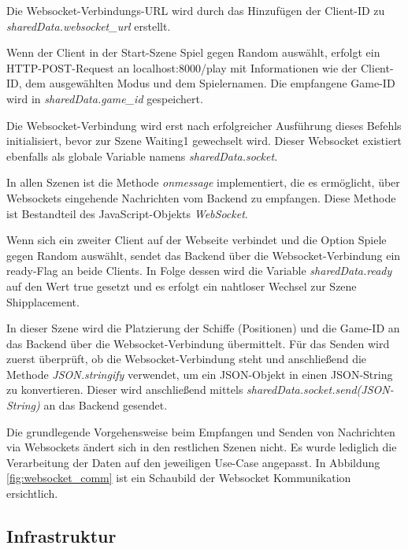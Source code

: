 \documentclass[a4paper, 10pt, conference]{IEEEtran}
\begin{document}
Die Websocket-Verbindungs-URL wird durch das Hinzufügen der Client-ID zu \textit{sharedData.websocket\_url} erstellt.

Wenn der Client in der Start-Szene \glqq Spiel gegen Random\grqq{} auswählt, erfolgt ein HTTP-POST-Request an \glqq localhost:8000/play\grqq{} mit Informationen wie der Client-ID, dem ausgewählten Modus und dem Spielernamen. Die empfangene Game-ID wird in \textit{sharedData.game\_id} gespeichert.

Die Websocket-Verbindung wird erst nach erfolgreicher Ausführung dieses Befehls initialisiert, bevor zur Szene \glqq Waiting1\grqq{} gewechselt wird. Dieser Websocket existiert ebenfalls als globale Variable namens \textit{sharedData.socket}.

In allen Szenen ist die Methode \textit{onmessage} implementiert, die es ermöglicht, über Websockets eingehende Nachrichten vom Backend zu empfangen. Diese Methode ist Bestandteil des JavaScript-Objekts \textit{WebSocket}.

Wenn sich ein zweiter Client auf der Webseite verbindet und die Option \glqq Spiele gegen Random\grqq{} auswählt, sendet das Backend über die Websocket-Verbindung ein \glqq ready\grqq{}-Flag an beide Clients. In Folge dessen wird die Variable \textit{sharedData.ready} auf den Wert \glqq true\grqq{} gesetzt und es erfolgt ein nahtloser Wechsel zur Szene \glqq Shipplacement\grqq{}.

In dieser Szene wird die Platzierung der Schiffe (Positionen) und die Game-ID an das Backend über die Websocket-Verbindung übermittelt. Für das Senden wird zuerst überprüft, ob die Websocket-Verbindung steht und anschließend die Methode \textit{JSON.stringify} verwendet, um ein JSON-Objekt in einen JSON-String zu konvertieren. Dieser wird anschließend mittels \textit{sharedData.socket.send(JSON-String)} an das Backend gesendet.

 Die grundlegende Vorgehensweise beim Empfangen und Senden von Nachrichten via Websockets ändert sich in den restlichen Szenen nicht. Es wurde lediglich die Verarbeitung der Daten auf den jeweiligen Use-Case angepasst. In Abbildung \ref{fig:websocket_comm} ist ein Schaubild der Websocket Kommunikation ersichtlich.





\subsection{Infrastruktur}\label{subsec:infrastruktur}
\end{document}
